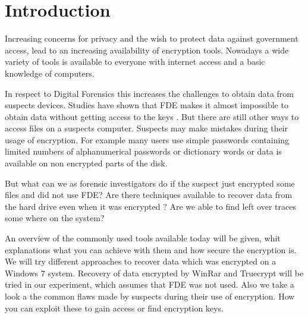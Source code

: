 \section{Introduction}
Increasing concerns for privacy and the wish to protect data against government access, lead to an increasing availability of encryption tools. Nowadays a wide variety of tools is available to everyone with internet access and a basic knowledge of computers.


In respect to Digital Forensics this increases the challenges to obtain data from suspects devices. Studies have shown that \gls{FDE} makes it almost impossible to obtain data without getting access to the keys \cite{casey:11}. But there are still other ways to access files on a suspects computer.  Suspects may make mistakes during their usage of encryption.  For example many users use simple passwords containing limited numbers of alphanumerical passwords or dictionary words \cite{worstpractise} or data is available on non encrypted parts of the disk.

But what can we as forensic investigators do if  the suspect just encrypted some files and did not use \gls{FDE}? Are there techniques available to recover data from the hard drive even when it was encrypted ? Are we able to find left over traces some where on the system?

An overview of the commonly used tools available today will be given, whit explanations what you can achieve with them and how secure the encryption is.
We will try different approaches to recover data which was encrypted on a Windows 7 system.  Recovery of data encrypted by WinRar and Truecrypt will be tried in our experiment, which assumes that \gls{FDE} was not used.
Also we take a look a the common flaws made by suspects during their use of encryption.  How you can exploit these to gain access or find encryption keys.
